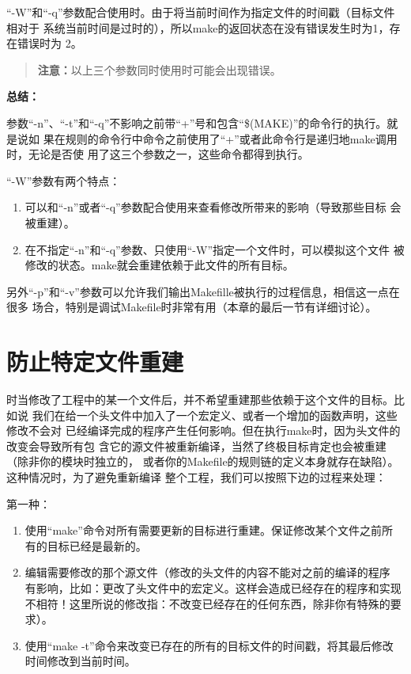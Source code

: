 “-W”和“-q”参数配合使用时。由于将当前时间作为指定文件的时间戳（目标文件相对于
系统当前时间是过时的），所以make的返回状态在没有错误发生时为1，存在错误时为
2。

\begin{quote}\kaishu
\textbf{注意：}以上三个参数同时使用时可能会出现错误。
\end{quote}

\noindent \textbf{总结：}

参数“-n”、“-t”和“-q”不影响之前带“+”号和包含“\$(MAKE)”的命令行的执行。就是说如
果在规则的命令行中命令之前使用了“+”或者此命令行是递归地make调用时，无论是否使
用了这三个参数之一，这些命令都得到执行。

“-W”参数有两个特点：

\begin{enumerate}
\itemsep=4pt \parskip=0pt
  \item 可以和“-n”或者“-q”参数配合使用来查看修改所带来的影响（导致那些目标
      会被重建）。
  \item 在不指定“-n”和“-q”参数、只使用“-W”指定一个文件时，可以模拟这个文件
      被修改的状态。make就会重建依赖于此文件的所有目标。
\end{enumerate}

另外“-p”和“-v”参数可以允许我们输出Makefille被执行的过程信息，相信这一点在很多
场合，特别是调试Makefile时非常有用（本章的最后一节有详细讨论）。


\section{防止特定文件重建}
时当修改了工程中的某一个文件后，并不希望重建那些依赖于这个文件的目标。比如说
我们在给一个头文件中加入了一个宏定义、或者一个增加的函数声明，这些修改不会对
已经编译完成的程序产生任何影响。但在执行make时，因为头文件的改变会导致所有包
含它的源文件被重新编译，当然了终极目标肯定也会被重建（除非你的模块时独立的，
或者你的Makefile的规则链的定义本身就存在缺陷）。这种情况时，为了避免重新编译
整个工程，我们可以按照下边的过程来处理：

第一种：

\begin{enumerate}
\itemsep=4pt \parskip=0pt
  \item 使用“make”命令对所有需要更新的目标进行重建。保证修改某个文件之前所
      有的目标已经是最新的。
  \item 编辑需要修改的那个源文件（修改的头文件的内容不能对之前的编译的程序
      有影响，比如：更改了头文件中的宏定义。这样会造成已经存在的程序和实现
      不相符！这里所说的修改指：不改变已经存在的任何东西，除非你有特殊的要
      求）。
  \item 使用“make -t”命令来改变已存在的所有的目标文件的时间戳，将其最后修改
      时间修改到当前时间。
\end{enumerate}

